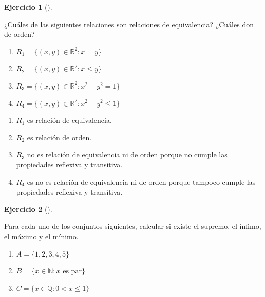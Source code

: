 \documentclass[
  a4paper,
]{scrreport}
\providecommand{\tightlist}{%
  \setlength{\itemsep}{0pt}\setlength{\parskip}{0pt}}\usepackage{longtable,booktabs,array}
\theoremstyle{definition}
\newtheorem{exercise}{Ejercicio}[chapter]
\theoremstyle{remark}
\begin{document}
\leavevmode{}%
\begin{exercise}[]\label{exr-relaciones-equivalencia}

¿Cuáles de las siguientes relaciones son relaciones de equivalencia?
¿Cuáles don de orden?

\begin{enumerate}
\def\labelenumi{\alph{enumi}.}
\tightlist
\item
  \(R_1=\{(x,y)\in \mathbb{R}^2: x = y\}\)
\item
  \(R_2=\{(x,y)\in \mathbb{R}^2: x\leq y\}\)
\item
  \(R_3=\{(x,y)\in \mathbb{R}^2: x^2 + y^2 = 1\}\)
\item
  \(R_4=\{(x,y)\in \mathbb{R}^2: x^2 + y^2 \leq 1\}\)
\end{enumerate}

\end{exercise}

\begin{tcolorbox}[enhanced jigsaw, breakable, title=\textcolor{quarto-callout-tip-color}{\faLightbulb}\hspace{0.5em}{Solución}, left=2mm, leftrule=.75mm, colback=white, bottomtitle=1mm, coltitle=black, bottomrule=.15mm, colframe=quarto-callout-tip-color-frame, colbacktitle=quarto-callout-tip-color!10!white, rightrule=.15mm, opacitybacktitle=0.6, arc=.35mm, toprule=.15mm, opacityback=0, toptitle=1mm, titlerule=0mm]

\begin{enumerate}
\def\labelenumi{\alph{enumi}.}
\tightlist
\item
  \(R_1\) es relación de equivalencia.
\item
  \(R_2\) es relación de orden.
\item
  \(R_3\) no es relación de equivalencia ni de orden porque no cumple
  las propiedades reflexiva y transitiva.
\item
  \(R_4\) es no es relación de equivalencia ni de orden porque tampoco
  cumple las propiedades reflexiva y transitiva.
\end{enumerate}

\end{tcolorbox}

\leavevmode{}%
\begin{exercise}[]\label{exr-supremo-infimo-maximo-minimo}

Para cada uno de los conjuntos siguientes, calcular si existe el
supremo, el ínfimo, el máximo y el mínimo.

\begin{enumerate}
\def\labelenumi{\alph{enumi}.}
\tightlist
\item
  \(A=\{1, 2, 3, 4, 5\}\)
\item
  \(B=\{x\in\mathbb{N} : x \mbox{ es par}\}\)
\item
  \(C=\{x\in\mathbb{Q} : 0< x \leq 1\}\)
\end{enumerate}

\end{exercise}
\end{document}

